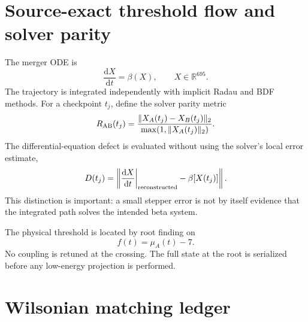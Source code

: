 \documentclass[12pt]{iopart}
\newcommand{\dd}{\mathrm{d}}
\begin{document}
\section{Source-exact threshold flow and solver parity}
\label{app:trajectory}

The merger ODE is
\begin{equation}
\frac{\dd X}{\dd t}=\beta(X),\qquad X\in\mathbb R^{695}.
\end{equation}
The trajectory is integrated independently with implicit Radau and BDF methods.  For a checkpoint $t_j$, define the solver parity metric
\begin{equation}
R_{\rm AB}(t_j)=\frac{\|X_A(t_j)-X_B(t_j)\|_2}{\max(1,\|X_A(t_j)\|_2)}.
\end{equation}
The differential-equation defect is evaluated without using the solver's local error estimate,
\begin{equation}
D(t_j)=\left\|\frac{\dd X}{\dd t}\bigg|_{\rm reconstructed}-\beta[X(t_j)]\right\|.
\end{equation}
This distinction is important: a small stepper error is not by itself evidence that the integrated path solves the intended beta system.

The physical threshold is located by root finding on
\begin{equation}
f(t)=\mu_A(t)-7.
\end{equation}
No coupling is retuned at the crossing.  The full state at the root is serialized before any low-energy projection is performed.

\section{Wilsonian matching ledger}
\label{app:matching}
\end{document}
